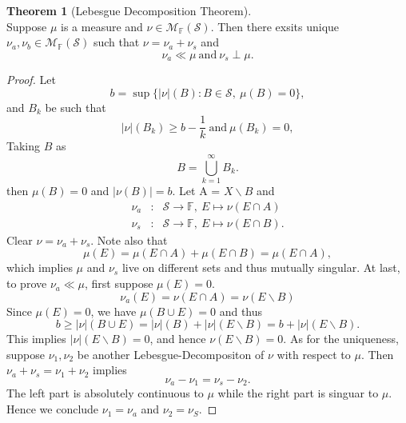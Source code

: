 \documentclass[12pt]{book}
\theoremstyle{definition}
\newtheorem{theorem}{Theorem}[chapter]
\newcommand{\F}{\mathbb{F}}
\newcommand{\M}{\mathcal{M}}
\newcommand{\Union}[2]{{\bigcup_{#1}^{#2}}}
\begin{document}
\begin{theorem}[Lebesgue Decomposition Theorem] \ \\
Suppose $\mu$ is a measure and $\nu \in \M_\F(\mathcal S)$. Then there exsits unique $\nu_a,\nu_b \in \M_\F(\mathcal S)$ such that $\nu=\nu_a+\nu_s$ and 
$$
\nu_a \ll \mu \ \text{and} \ \nu_s \perp \mu.
$$
\end{theorem}
\begin{proof}
Let 
$$
b = \sup \{ |\nu|(B): B\in \mathcal S, \ \mu(B) = 0\},
$$
and $B_k$ be such that 
$$
|\nu|(B_k)\geq b -\frac{1}{k} \ \text{and} \ \mu(B_k)=0,
$$
Taking $B$ as 
$$
B = \Union{k=1}{\infty}B_k.
$$
then $\mu(B)=0$ and $|\nu(B)|=b$. Let A = $X\backslash B$ and 
\begin{eqnarray*}
	\nu_a &:& \mathcal S \to \F, \ E\mapsto \nu(E\cap A) \\
	\nu_s &:& \mathcal S \to \F, \ E\mapsto \nu(E\cap B).
\end{eqnarray*}
Clear $\nu = \nu_a + \nu_s$. Note also that 
$$
\mu(E) = \mu(E\cap A) + \mu(E \cap B) = \mu(E \cap A),
$$
which implies $\mu$ and $\nu_s$ live on different sets and thus mutually singular.
At last, to prove $\nu_a \ll \mu$, first suppose $\mu(E)=0$.
$$
\nu_a(E) = \nu(E\cap A) = \nu(E\backslash B)
$$
Since $\mu(E)=0$, we have $\mu(B\cup E)=0$ and thus
$$
b\geq |\nu|(B\cup E) = |\nu|(B) + |\nu|(E\backslash B) = b + |\nu|(E\backslash B).
$$
This implies $|\nu|(E\backslash B)=0$, and hence $\nu(E\backslash B)=0$.
As for the uniqueness, suppose $\nu_1,\nu_2$ be another Lebesgue-Decompositon of $\nu$ with respect to $\mu$. Then $\nu_a + \nu_s = \nu_1 + \nu_2$ implies
$$
\nu_a - \nu_1 = \nu_s - \nu_2.
$$
The left part is absolutely continuous to $\mu$ while the right part is singuar to $\mu$. 
Hence we conclude $\nu_1=\nu_a$ and $\nu_2=\nu_S$.
\end{proof}
\end{document}
